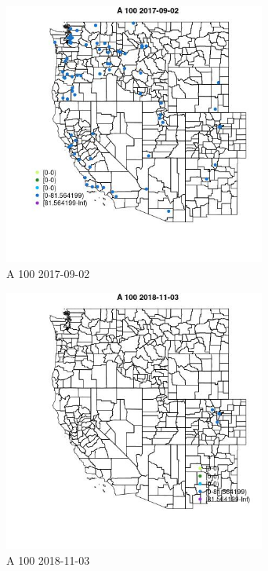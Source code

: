 \begin{figure} 
\centering  
\includegraphics[width=0.77\textwidth]{Code_Outputs/Report_ML_input_PM25_Step4_part_e_de_duplicated_aveswNAs_MapObsA_1002017-09-02.jpg} 
\caption{\label{fig:Report_ML_input_PM25_Step4_part_e_de_duplicated_aveswNAsMapObsA_1002017-09-02}A 100 2017-09-02} 
\end{figure} 
 

\clearpage 

\begin{figure} 
\centering  
\includegraphics[width=0.77\textwidth]{Code_Outputs/Report_ML_input_PM25_Step4_part_e_de_duplicated_aveswNAs_MapObsA_1002018-11-03.jpg} 
\caption{\label{fig:Report_ML_input_PM25_Step4_part_e_de_duplicated_aveswNAsMapObsA_1002018-11-03}A 100 2018-11-03} 
\end{figure} 
 

